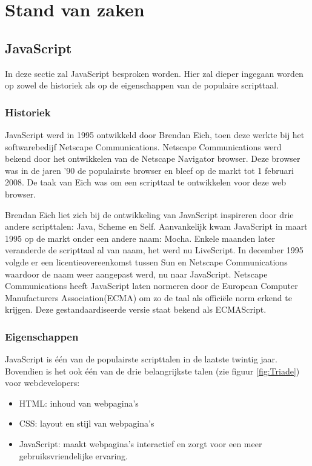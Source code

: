 \chapter{Stand van zaken}
\label{ch:stand-van-zaken}



\section{JavaScript}
In deze sectie zal JavaScript besproken worden. Hier zal dieper ingegaan worden op zowel de historiek als op de eigenschappen van de populaire scripttaal.

\subsection{Historiek}
JavaScript werd in 1995 ontwikkeld door Brendan Eich, toen deze werkte bij het softwarebedijf Netscape Communications. Netscape Communications werd bekend door het ontwikkelen van de Netscape Navigator browser. Deze browser was in de jaren '90 de populairste browser en bleef op de markt tot 1 februari 2008. De taak van Eich was om een scripttaal te ontwikkelen voor deze web browser. 

Brendan Eich liet zich bij de ontwikkeling van JavaScript inspireren door drie andere scripttalen: Java, Scheme en Self. Aanvankelijk kwam JavaScript in maart 1995 op de markt onder een andere naam: Mocha. Enkele maanden later veranderde de scripttaal al van naam, het werd nu LiveScript. In december 1995 volgde er een licentieovereenkomst tussen Sun en Netscape Communications waardoor de naam weer aangepast werd, nu naar JavaScript.
Netscape Communications heeft JavaScript laten normeren door de European Computer Manufacturers Association(ECMA) om zo de taal als officiële norm erkend te krijgen. 
Deze gestandaardiseerde versie staat bekend als ECMAScript.

\subsection{Eigenschappen}
JavaScript is één van de populairste scripttalen in de laatste twintig jaar.
Bovendien is het ook één van de drie belangrijkste talen (zie figuur \ref{fig:Triade}) voor webdevelopers:
\begin{itemize}
\item HTML: inhoud van webpagina's
\item CSS: layout en stijl van webpagina's
\item JavaScript: maakt webpagina's interactief en zorgt voor een meer gebruiksvriendelijke ervaring.

\end{itemize}
\graphicspath{{./img/}}

